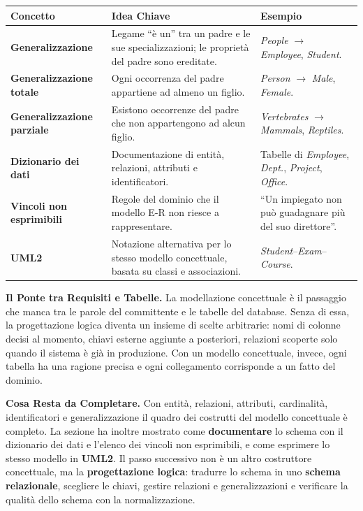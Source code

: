 \documentclass[12pt]{extarticle}
\begin{document}
\begin{center}
\small
\begin{tabular}{@{}L{4.2cm}L{6.4cm}L{5.2cm}@{}}
    \toprule
    \textbf{Concetto} & \textbf{Idea Chiave} & \textbf{Esempio} \\
    \midrule
    \textbf{Generalizzazione} & Legame ``è un'' tra un padre e le sue specializzazioni; le proprietà del padre sono ereditate. & \textit{People} $\to$ \textit{Employee}, \textit{Student}. \\
    \addlinespace
    \textbf{Generalizzazione totale} & Ogni occorrenza del padre appartiene ad almeno un figlio. & \textit{Person} $\to$ \textit{Male}, \textit{Female}. \\
    \addlinespace
    \textbf{Generalizzazione parziale} & Esistono occorrenze del padre che non appartengono ad alcun figlio. & \textit{Vertebrates} $\to$ \textit{Mammals}, \textit{Reptiles}. \\
    \addlinespace
    \textbf{Dizionario dei dati} & Documentazione di entità, relazioni, attributi e identificatori. & Tabelle di \textit{Employee}, \textit{Dept.}, \textit{Project}, \textit{Office}. \\
    \addlinespace
    \textbf{Vincoli non esprimibili} & Regole del dominio che il modello E-R non riesce a rappresentare. & ``Un impiegato non può guadagnare più del suo direttore''. \\
    \addlinespace
    \textbf{UML2} & Notazione alternativa per lo stesso modello concettuale, basata su classi e associazioni. & \textit{Student}--\textit{Exam}--\textit{Course}. \\
    \bottomrule
\end{tabular}
\end{center}

\medskip
\noindent \textbf{Il Ponte tra Requisiti e Tabelle.} La modellazione concettuale è il passaggio che manca tra le parole del committente e le tabelle del database. Senza di essa, la progettazione logica diventa un insieme di scelte arbitrarie: nomi di colonne decisi al momento, chiavi esterne aggiunte a posteriori, relazioni scoperte solo quando il sistema è già in produzione. Con un modello concettuale, invece, ogni tabella ha una ragione precisa e ogni collegamento corrisponde a un fatto del dominio.

\medskip
\noindent \textbf{Cosa Resta da Completare.} Con entità, relazioni, attributi, cardinalità, identificatori e generalizzazione il quadro dei costrutti del modello concettuale è completo. La sezione ha inoltre mostrato come \textbf{documentare} lo schema con il dizionario dei dati e l'elenco dei vincoli non esprimibili, e come esprimere lo stesso modello in \textbf{UML2}. Il passo successivo non è un altro costruttore concettuale, ma la \textbf{progettazione logica}: tradurre lo schema in uno \textbf{schema relazionale}, scegliere le chiavi, gestire relazioni e generalizzazioni e verificare la qualità dello schema con la normalizzazione.
\end{document}

